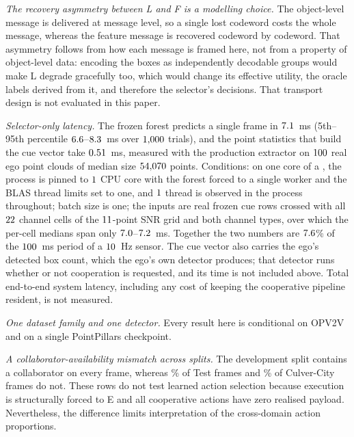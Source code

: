\documentclass[journal]{IEEEtran}
\begin{document}
\emph{The recovery asymmetry between L and F is a modelling choice.} The object-level message is
delivered at message level, so a single lost codeword costs the whole message, whereas the
feature message is recovered codeword by codeword. That asymmetry follows from how each message is
framed here, not from a property of object-level data: encoding the boxes as independently
decodable groups would make L degrade gracefully too, which would change its effective utility, the
oracle labels derived from it, and therefore the selector's decisions. That transport design is not
evaluated in this paper.

\emph{Selector-only latency.} The frozen forest predicts a single frame in
$7.1$~ms (5th--95th percentile $6.6$--$8.3$~ms over
$1{,}000$ trials), and the point statistics that build the cue vector take
$0.51$~ms, measured with the production extractor on $100$ real ego point clouds
of median size $54{,}070$ points. Conditions: on one core of a \LatencyCpu{}, the process is pinned to
$1$ CPU core with the forest forced to a single worker and the BLAS thread limits set to one, and
$1$ thread is observed in the process throughout; batch size is one; the inputs are
real frozen cue rows crossed with all $22$ channel cells of the
$11$-point SNR grid and both channel types, over which the per-cell medians span
only $7.0$--$7.2$~ms. Together the two numbers are $7.6$\% of the
$100$~ms period of a $10$~Hz sensor. The cue vector also carries the ego's detected box
count, which the ego's own detector produces; that detector runs whether or not cooperation is
requested, and its time is not included above. Total end-to-end system latency, including any cost
of keeping the cooperative pipeline resident, is not measured.

\emph{One dataset family and one detector.} Every result here is conditional on OPV2V and on a single
PointPillars checkpoint.

\emph{A collaborator-availability mismatch across splits.} The development split contains a
collaborator on every frame, whereas \TestNoCollab\% of Test frames and \CulverNoCollab\% of
Culver-City frames do not. These rows do not test learned action selection because execution is
structurally forced to E and all cooperative actions have zero realised payload. Nevertheless, the
difference limits interpretation of the cross-domain action proportions.
\end{document}

